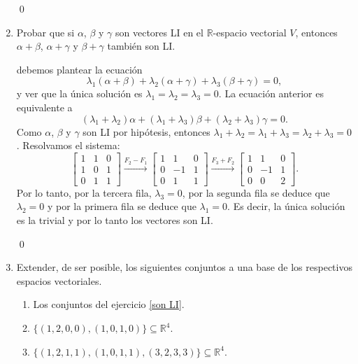 \begin{enumerate}[resume, topsep=6pt, itemsep=.4cm]
    \qed     
    
    \item  Probar que si $\alpha$, $\beta$ y $\gamma$ son vectores LI en el $\mathbb{R}$-espacio vectorial $V$, entonces $\alpha +\beta$, $\alpha +\gamma$ y $\beta +\gamma $ también son LI.
    
    
    \rta debemos plantear la ecuación
    $$
    \lambda_1 (\alpha +\beta)+\lambda_2 (\alpha +\gamma)+\lambda_3 (\beta +\gamma)=0,
    $$
    y ver que la única solución es $\lambda_1=\lambda_2=\lambda_3=0$. La ecuación anterior es equivalente a 
    $$
    (\lambda_1+\lambda_2)\alpha+(\lambda_1+\lambda_3)\beta+(\lambda_2+\lambda_3)\gamma=0.
    $$  
    Como $\alpha$, $\beta$ y $\gamma$ son LI por hipótesis, entonces $\lambda_1+\lambda_2=\lambda_1+\lambda_3=\lambda_2+\lambda_3=0$. Resolvamos el sistema:
    $$
    \begin{bmatrix}
        1 & 1 & 0\\
        1 & 0 & 1\\
        0 & 1 & 1
    \end{bmatrix}
    \stackrel{F_2-F_1}{\longrightarrow}
    \begin{bmatrix}
        1 & 1 & 0\\
        0 & -1 & 1\\
        0 & 1 & 1
    \end{bmatrix}
    \stackrel{F_3+F_2}{\longrightarrow}
    \begin{bmatrix}
        1 & 1 & 0\\
        0 & -1 & 1\\
        0 & 0 & 2
    \end{bmatrix}.
    $$
    Por lo tanto, por la tercera fila, $\lambda_3=0$, por la segunda fila se deduce que $\lambda_2=0$ y por la primera fila se deduce que $\lambda_1=0$. Es decir, la única solución es la trivial y por lo tanto los vectores son LI.

    \qed     
    
    \item Extender, de ser posible, los siguientes conjuntos a una base de los respectivos espacios vectoriales.
    
    \begin{enumerate}
        \item\label{extender-a} Los conjuntos del ejercicio \ref{son LI}.
        \item\label{extender-b} $\{ (1,2,0,0),(1,0,1,0) \}\subseteq\mathbb{R}^4$.
        \item\label{extender-c} $\{ (1,2,1,1),(1,0,1,1),(3,2,3,3)\}\subseteq\mathbb{R}^4$.
    \end{enumerate}
    

\end{enumerate}
